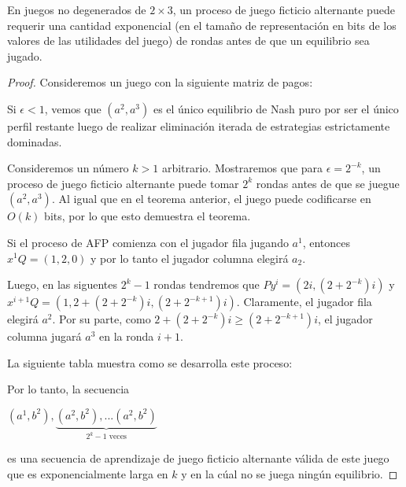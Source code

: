 \begin{theorem}
    En juegos no degenerados de $2 \times 3$, un proceso de juego ficticio alternante puede requerir una cantidad exponencial (en el tamaño de representación en bits de los valores de las utilidades del juego) de rondas antes de que un equilibrio sea jugado.
\end{theorem}

\begin{proof}
    Consideremos un juego con la siguiente matriz de pagos:

    

    Si $\epsilon < 1$, vemos que $(a^2, a^3)$ es el único equilibrio de Nash puro
    por ser el único perfil restante luego de realizar eliminación iterada de estrategias estrictamente dominadas.

    Consideremos un número $k > 1$ arbitrario. Mostraremos que para $\epsilon = 2^{-k}$, un proceso de juego ficticio alternante puede tomar $2^k$ rondas antes de que se juegue $(a^2, a^3)$. Al igual que en el teorema anterior, el juego puede codificarse en $O(k)$ bits, por lo que esto demuestra el teorema.

    Si el proceso de AFP comienza con el jugador fila jugando $a^1$, entonces $x^1Q = (1, 2, 0)$ y por lo tanto el jugador columna elegirá $a_2$.

    Luego, en las siguentes $2^k - 1$ rondas tendremos que $Py^i = (2i, (2+2^{-k})i)$ y $x^{i+1}Q = (1, 2+(2+2^{-k})i, (2+2^{-k+1})i)$. Claramente, el jugador fila elegirá $a^2$. Por su parte, como $2+(2+2^{-k})i \ge (2+2^{-k+1})i$, el jugador columna jugará $a^3$ en la ronda $i + 1$.

    La siguiente tabla muestra como se desarrolla este proceso:

    

    Por lo tanto, la secuencia

    \begin{center}
    \begin{math}
        (a^1, b^2), \underbrace{(a^2, b^2), ... (a^2, b^2)}_{\text{$2^k - 1$ veces}}
    \end{math}
    \end{center}

    es una secuencia de aprendizaje de juego ficticio alternante válida de este juego que es exponencialmente larga en $k$ y en la cúal no se juega ningún equilibrio.

\end{proof}


